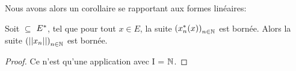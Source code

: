 Nous avons alors un corollaire se rapportant aux formes linéaires:

\begin{corollary}
	Soit  $\subseteq$ $E^{*}$, tel que pour
	tout $x \in E$, la suite ${(x_{n}^{*}(x))}_{n \in \mathbb{N}}$ est bornée. Alors
	la suite ${(||x_{n}||)}_{n \in \mathbb{N}}$ est bornée.
\end{corollary}

\begin{proof}
	Ce n'est qu'une application avec I = $\mathbb{N}$.
\end{proof}

